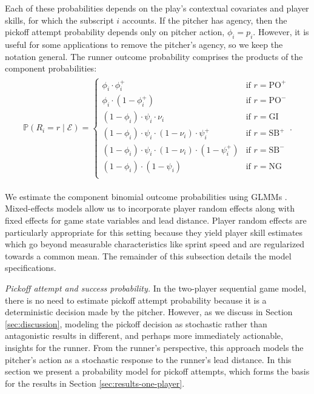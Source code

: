 \documentclass[aoas]{imsart}
\begin{document}
      Each of these probabilities depends on the play's contextual covariates and player skills, for which the subscript $i$ accounts. If the pitcher has agency, then the pickoff attempt probability depends only on pitcher action, $\phi_i = p_i$. However, it is useful for some applications to remove the pitcher's agency, so we keep the notation general. The runner outcome probability comprises the products of the component probabilities:
      \begin{align}
        \label{eqn:prob-runner-outcome-two-player}
        \begin{split}
          \mathbb{P}(R_i = r \mid \mathcal{E}) =
          \begin{cases}
            \phi_i \cdot \phi_i^+                                             & \mbox{if } r = \mbox{PO}^+\\
            \phi_i \cdot (1 - \phi_i^+)                                       & \mbox{if } r = \mbox{PO}^-\\
            (1 - \phi_i) \cdot \psi_i \cdot \nu_i                             & \mbox{if } r = \mbox{GI}\\
            (1 - \phi_i) \cdot \psi_i \cdot (1 - \nu_i) \cdot \psi_i^+        & \mbox{if } r = \mbox{SB}^+\\
            (1 - \phi_i) \cdot \psi_i \cdot (1 - \nu_i) \cdot (1 - \psi_i^+)  & \mbox{if } r = \mbox{SB}^-\\
            (1 - \phi_i) \cdot (1 - \psi_i)                                   & \mbox{if } r = \mbox{NG}\\
          \end{cases}.
        \end{split}
      \end{align}

      We estimate the component binomial outcome probabilities using GLMMs \citep{stroup_generalized_2012}. Mixed-effects models allow us to incorporate player random effects along with fixed effects for game state variables and lead distance. Player random effects are particularly appropriate for this setting because they yield player skill estimates which go beyond measurable characteristics like sprint speed and are regularized towards a common mean. The remainder of this subsection details the model specifications.
      
      \textit{Pickoff attempt and success probability.} In the two-player sequential game model, there is no need to estimate pickoff attempt probability because it is a deterministic decision made by the pitcher. However, as we discuss in Section \ref{sec:discussion}, modeling the pickoff decision as stochastic rather than antagonistic results in different, and perhaps more immediately actionable, insights for the runner. From the runner's perspective, this approach models the pitcher's action as a stochastic response to the runner's lead distance. In this section we present a probability model for pickoff attempts, which forms the basis for the results in Section \ref{sec:results-one-player}.
\end{document}
